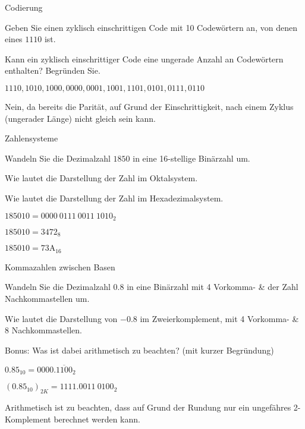 \documentclass{exercisesheet}
\begin{document}
\begin{exercises}{Codierung}
\item Geben Sie einen zyklisch einschrittigen Code mit 10 Codewörtern an, von denen eines $1110$ ist.
\item Kann ein zyklisch einschrittiger Code eine ungerade Anzahl an Codewörtern enthalten? Begründen Sie.
\end{exercises}

\begin{solutions}
  \item $1110, 1010, 1000, 0000, 0001, 1001, 1101, 0101, 0111, 0110$
  \item Nein, da bereits die Parität, auf Grund der Einschrittigkeit, nach einem Zyklus (ungerader Länge) nicht gleich sein kann.
\end{solutions}

\begin{exercises}{Zahlensysteme}
\item Wandeln Sie die Dezimalzahl $1850$ in eine 16-stellige Binärzahl um.\points[4]
\item Wie lautet die Darstellung der Zahl im Oktalsystem.\points
\item Wie lautet die Darstellung der Zahl im Hexadezimalsystem.\points
\end{exercises}

\begin{solutions}
  \item $1850{10} = {0000\ 0111\ 0011\ 1010}_2$
  \item $1850{10} = {3472}_8$
  \item $1850{10} = {\mathrm{73A}}_{16}$
\end{solutions}

\begin{exercises}{Kommazahlen zwischen Basen}
\item Wandeln Sie die Dezimalzahl $0.8$ in eine Binärzahl mit 4 Vorkomma- \& der Zahl Nachkommastellen um.\points[4]
\item Wie lautet die Darstellung von $-0.8$ im Zweierkomplement, mit 4 Vorkomma- \& 8 Nachkommastellen.\points[2]
\item Bonus: Was ist dabei arithmetisch zu beachten? (mit kurzer Begründung)\points[3]
\end{exercises}

\begin{solutions}
  \item $0.85_{10} = {0000.\overline{1100}}_2$
  \item $ (0.85_{10})_{2K} = {1111.0011\ 0100}_2$
  \item Arithmetisch ist zu beachten, dass auf Grund der Rundung nur ein ungefähres 2-Komplement berechnet werden kann.
\end{solutions}
\end{document}

